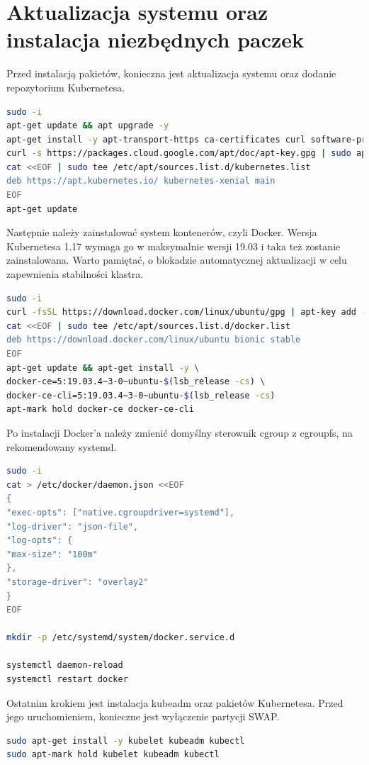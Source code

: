 \documentclass[pl,final,oneside]{mgr} %
\begin{document}
\section{Aktualizacja systemu oraz instalacja niezbędnych paczek}
Przed instalacją pakietów, konieczna jest aktualizacja systemu oraz dodanie repozytorium Kubernetesa.
\begin{lstlisting}[language=Bash]
sudo -i
apt-get update && apt upgrade -y
apt-get install -y apt-transport-https ca-certificates curl software-properties-common
curl -s https://packages.cloud.google.com/apt/doc/apt-key.gpg | sudo apt-key add -
cat <<EOF | sudo tee /etc/apt/sources.list.d/kubernetes.list
deb https://apt.kubernetes.io/ kubernetes-xenial main
EOF
apt-get update
\end{lstlisting}

Następnie należy zainstalować system kontenerów, czyli Docker. Wersja Kubernetesa 1.17 wymaga go w maksymalnie wersji 19.03 i taka też zostanie zainstalowana. Warto pamiętać, o blokadzie automatycznej aktualizacji w celu zapewnienia stabilności klastra.

\begin{lstlisting}[language=Bash]
sudo -i
curl -fsSL https://download.docker.com/linux/ubuntu/gpg | apt-key add -
cat <<EOF | sudo tee /etc/apt/sources.list.d/docker.list
deb https://download.docker.com/linux/ubuntu bionic stable
EOF
apt-get update && apt-get install -y \
docker-ce=5:19.03.4~3-0~ubuntu-$(lsb_release -cs) \
docker-ce-cli=5:19.03.4~3-0~ubuntu-$(lsb_release -cs)
apt-mark hold docker-ce docker-ce-cli
\end{lstlisting}	
Po instalacji Docker'a należy zmienić domyślny sterownik cgroup z cgroupfs, na rekomendowany systemd. 
\begin{lstlisting}[language=Bash]
sudo -i
cat > /etc/docker/daemon.json <<EOF
{
"exec-opts": ["native.cgroupdriver=systemd"],
"log-driver": "json-file",
"log-opts": {
"max-size": "100m"
},
"storage-driver": "overlay2"
}
EOF

mkdir -p /etc/systemd/system/docker.service.d

systemctl daemon-reload
systemctl restart docker
\end{lstlisting}
Ostatnim krokiem jest instalacja kubeadm oraz pakietów Kubernetesa. Przed jego uruchomieniem, konieczne jest wyłączenie partycji SWAP.
\begin{lstlisting}[language=Bash]
sudo apt-get install -y kubelet kubeadm kubectl
sudo apt-mark hold kubelet kubeadm kubectl
\end{lstlisting}
\end{document}
